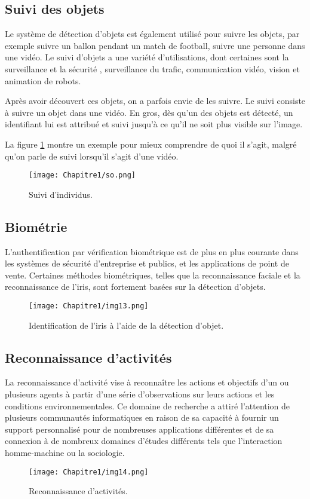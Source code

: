 \subsection{Suivi des objets}
Le système de détection d'objets est également utilisé pour suivre les objets, par exemple suivre un ballon pendant un match de football, suivre une personne dans une vidéo. Le suivi d'objets a une variété d'utilisations, dont certaines sont la surveillance et la sécurité , surveillance du trafic, communication vidéo, vision et animation de robots.

Après avoir découvert ces objets, on a parfois envie de les suivre. Le suivi consiste à suivre un objet dans une vidéo. En gros, dès qu'un des objets est détecté, un identifiant lui est attribué et suivi jusqu'à ce qu'il ne soit plus visible sur l'image.

La figure \ref{so} montre un exemple pour mieux comprendre de quoi il s'agit, malgré qu'on parle de suivi lorsqu'il s'agit d'une vidéo.

\begin{figure}[H]
\centering
\texttt{[image: Chapitre1/so.png]}
\caption{Suivi d'individus.}
\label{so}
\end{figure}     
     \subsection{Biométrie}
       
     L'authentification par vérification biométrique est de plus en plus courante dans les systèmes de sécurité d'entreprise et publics,  et les applications de point de vente. Certaines méthodes biométriques, telles que la reconnaissance faciale et la reconnaissance de l'iris, sont fortement basées sur la détection d'objets.
     \begin{figure}[H]
          \centering
          \texttt{[image: Chapitre1/img13.png]}
          \caption{Identification de l'iris à l'aide de la détection d'objet.}
          \label{img13}
          \end{figure}
     
     \subsection{Reconnaissance d'activités}
     La reconnaissance d'activité vise à reconnaître les actions et objectifs d'un ou plusieurs agents à partir d'une série d'observations sur leurs actions et les conditions environnementales. Ce domaine de recherche a attiré l'attention de plusieurs communautés informatiques en raison de sa capacité à fournir un support personnalisé pour de nombreuses applications différentes et de sa connexion à de nombreux domaines d'études différents tels que l'interaction homme-machine ou la sociologie.
     \begin{figure}[H]
          \centering
          \texttt{[image: Chapitre1/img14.png]}
          \caption{Reconnaissance d'activités.}
          \label{img14}
          \end{figure}

